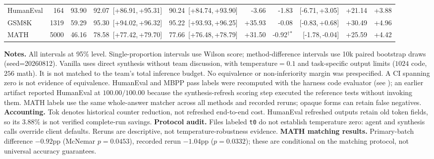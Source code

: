\begin{table}[t]
{\begin{tabular}{@{} l r r r r r r r r r @{}}
HumanEval       &   164 &   93.90 & 92.07~[+86.91,\,+95.31] & 90.24~[+84.74,\,+93.90] &  -3.66 & -1.83       & [-6.71,\,+3.05] & +21.14 &  +3.88 \\
GSM8K           &  1319 &   59.29 & 95.30~[+94.02,\,+96.32] & 95.22~[+93.93,\,+96.25] & +35.93 & -0.08       & [-0.83,\,+0.68] & +30.49 &  +4.96 \\
MATH            &  5000 &   46.16 & 78.58~[+77.42,\,+79.70] & 77.66~[+76.48,\,+78.79] & +31.50 & -0.92$^\dagger$$^*$ & [-1.78,\,-0.04] & +25.59 &  +4.42 \\
\bottomrule
\end{tabular}}
\vspace{0.3em}
\parbox{\dimexpr\linewidth-2\fboxsep-2\fboxrule\relax}{\sloppy\footnotesize
\textbf{Notes.} All intervals at 95\% level. Single-proportion intervals use Wilson score; method-difference intervals use 10k paired bootstrap draws (seed=20260812).
Vanilla uses direct synthesis without team discussion, with temperature$=0.1$ and task-specific output limits ($1024$ code, $256$ math). It is not matched to the team's total inference budget.
No equivalence or non-inferiority margin was prespecified. A CI spanning zero is not evidence of equivalence.
HumanEval and MBPP pass labels were recomputed with the harness code evaluator (see ); an earlier artifact reported HumanEval at $100.00/100.00$ because the synthesis-refresh scoring step executed the reference tests without invoking them.
MATH labels use the same whole-answer matcher across all methods and recorded reruns; opaque forms can retain false negatives.
\textbf{Accounting.} Tok denotes historical counter reduction, not refreshed end-to-end cost.
HumanEval refreshed outputs retain old token fields, so its $3.88\%$ is not verified complete-run savings.
\textbf{Protocol audit.} Files labeled \texttt{t0} do not establish temperature zero: agent and synthesis calls override client defaults. Reruns are descriptive, not temperature-robustness evidence.
\textbf{MATH matching results.} Primary-batch difference $-0.92$pp (McNemar $p=0.0453$), recorded rerun $-1.04$pp ($p=0.0332$); these are conditional on the matching protocol, not universal accuracy guarantees.}
\end{table}
